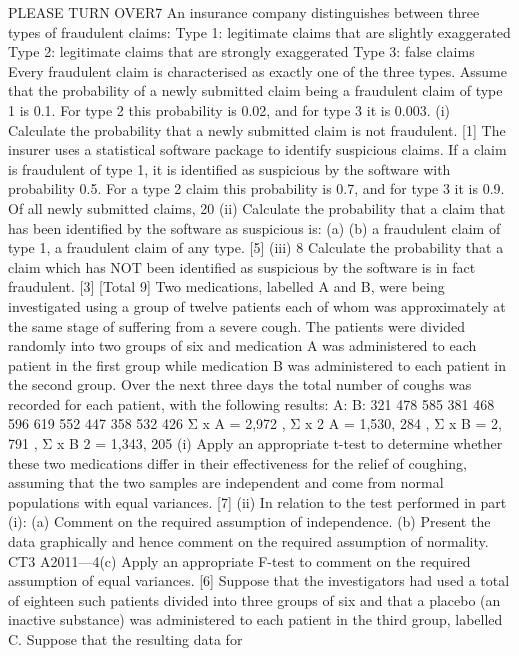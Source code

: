 \documentclass[a4paper,12pt]{article}
\begin{document}
\begin{enumerate}
PLEASE TURN OVER7
An insurance company distinguishes between three types of fraudulent claims:
Type 1: legitimate claims that are slightly exaggerated
Type 2: legitimate claims that are strongly exaggerated
Type 3: false claims
Every fraudulent claim is characterised as exactly one of the three types. Assume that
the probability of a newly submitted claim being a fraudulent claim of type 1 is 0.1.
For type 2 this probability is 0.02, and for type 3 it is 0.003.
(i)
Calculate the probability that a newly submitted claim is not fraudulent.
[1]
The insurer uses a statistical software package to identify suspicious claims. If a
claim is fraudulent of type 1, it is identified as suspicious by the software with
probability 0.5. For a type 2 claim this probability is 0.7, and for type 3 it is 0.9.
Of all newly submitted claims, 20%
(ii)
Calculate the probability that a claim that has been identified by the software
as suspicious is:
(a)
(b)
a fraudulent claim of type 1,
a fraudulent claim of any type.
[5]
(iii)
8
Calculate the probability that a claim which has NOT been identified as
suspicious by the software is in fact fraudulent.
[3]
[Total 9]
Two medications, labelled A and B, were being investigated using a group of twelve
patients each of whom was approximately at the same stage of suffering from a severe
cough. The patients were divided randomly into two groups of six and medication A
was administered to each patient in the first group while medication B was
administered to each patient in the second group. Over the next three days the total
number of coughs was recorded for each patient, with the following results:
A:
B:
321
478
585
381
468
596
619
552
447
358
532
426
Σ x A = 2,972 , Σ x 2 A = 1,530, 284 , Σ x B = 2, 791 , Σ x B 2 = 1,343, 205
(i) Apply an appropriate t-test to determine whether these two medications differ
in their effectiveness for the relief of coughing, assuming that the two samples
are independent and come from normal populations with equal variances. [7]
(ii) In relation to the test performed in part (i):
(a) Comment on the required assumption of independence.
(b) Present the data graphically and hence comment on the required
assumption of normality.
CT3 A2011—4(c)
Apply an appropriate F-test to comment on the required assumption of
equal variances.
[6]
Suppose that the investigators had used a total of eighteen such patients divided into
three groups of six and that a placebo (an inactive substance) was administered to
each patient in the third group, labelled C. Suppose that the resulting data for

\end{enumerate}
\end{document}
